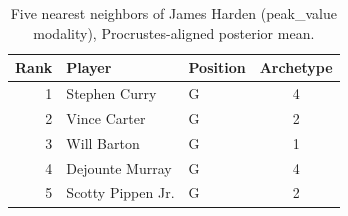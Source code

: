 \begin{table}[htbp]
  \centering\small
  \begin{tabular}{rllc}
    \toprule
    Rank & Player & Position & Archetype \\
    \midrule
    1 & Stephen Curry & G & 4 \\
    2 & Vince Carter & G & 2 \\
    3 & Will Barton & G & 1 \\
    4 & Dejounte Murray & G & 4 \\
    5 & Scotty Pippen Jr. & G & 2 \\
    \bottomrule
  \end{tabular}
  \caption{Five nearest neighbors of James Harden (peak_value modality), Procrustes-aligned posterior mean.}
  \label{tab:James_Harden_neighbors_peak_value}
\end{table}


